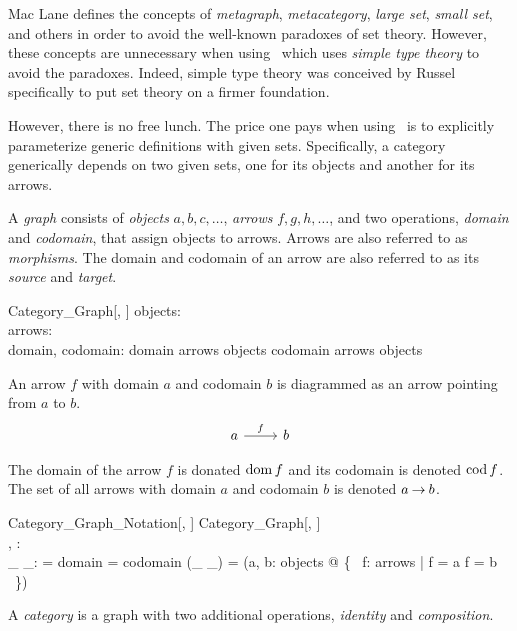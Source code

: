 \documentclass{amsart}
\begin{document}
Mac Lane\cite{maclane-cftwm} defines the concepts of \textit{metagraph}, \textit{metacategory}, \textit{large set},  \textit{small set}, and others 
in order to avoid the well-known paradoxes of set theory.
However, these concepts are unnecessary when using \ZN\ which uses \textit{simple type theory} to avoid the paradoxes.
Indeed, simple type theory was conceived by Russel specifically to put set theory on a firmer foundation.

However, there is no free lunch.
The price one pays when using \ZN\ is to explicitly parameterize generic definitions with given sets.
Specifically, a category generically depends on two given sets, one for its objects and another for its arrows.

A \textit{graph} consists of \textit{objects} $a, b, c, \dots$, \textit{arrows} $f, g, h, \dots$, 
and two operations, \textit{domain} and \textit{codomain}, that assign objects to arrows.
Arrows are also referred to as \textit{morphisms}.
The domain and codomain of an arrow are also referred to as its \textit{source} and \textit{target}.
\begin{schema}{Category\_Graph}[\genO, \genA]
	objects: \power \genO \\
	arrows: \power \genA \\
	domain, codomain: \genA \pfun \genO
\where
	domain \in arrows \fun objects
\also
	codomain \in arrows \fun objects
\end{schema}

An arrow $f$ with domain $a$ and codomain $b$ is diagrammed as an arrow pointing from $a$ to $b$.
$$
 \begin{tikzcd}
	a \arrow{r}{f} & b 
\end{tikzcd}
$$

The domain of the arrow $f$ is donated $\operatorname{dom} f$ and its codomain is denoted $\operatorname{cod} f$.
The set of all arrows with domain $a$ and codomain $b$ is denoted $a \mathbin{\rightarrow} b$.

\begin{schema}{Category\_Graph\_Notation}[\genO, \genA]
	Category\_Graph[\genO, \genA] \\
	\domCat, \codCat: \genA \pfun \genO \\
	\_ \arrCat \_: \genO \cross \genO \pfun \power \genA
\where
	\domCat = domain
\also
	\codCat = codomain
\also
	(\_ \arrCat \_) = (\lambda a, b: objects @ \{~ f: arrows | \domCat f = a \land \codCat f = b ~\})
\end{schema}

A \textit{category} is a graph with two additional operations, \textit{identity} and \textit{composition}.
\end{document}
